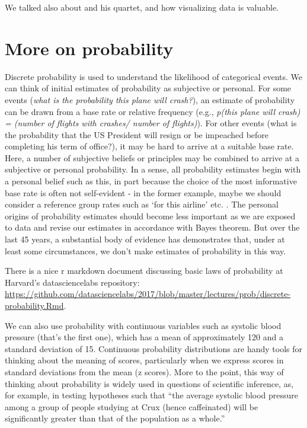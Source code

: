 \documentclass[]{book}
\theoremstyle{definition}
\theoremstyle{definition}
\theoremstyle{definition}
\theoremstyle{remark}
\begin{document}
We talked also about \citet{anscombe1973graphs} and his quartet, and how
visualizing data is valuable.

\section{More on probability}\label{more-on-probability}

Discrete probability is used to understand the likelihood of categorical
events. We can think of initial estimates of probability as subjective
or personal. For some events (\emph{what is the probability this plane
will crash?}), an estimate of probability can be drawn from a base rate
or relative frequency (e.g., \emph{p(this plane will crash) = (number of
flights with crashes/ number of flights)}). For other events (what is
the probability that the US President will resign or be impeached before
completing his term of office?), it may be hard to arrive at a suitable
base rate. Here, a number of subjective beliefs or principles may be
combined to arrive at a subjective or personal probability. In a sense,
all probability estimates begin with a personal belief such as this, in
part because the choice of the most informative base rate is often not
self-evident - in the former example, maybe we should consider a
reference group rates such as `for this airline' etc.
\citep[(][]{lanning1987some}. The personal origins of probability
estimates should become less important as we are exposed to data and
revise our estimates in accordance with Bayes theorem. But over the last
45 years, a substantial body of evidence has demonstrates that, under at
least some circumstances, we don't make estimates of probability in this
way.

There is a nice r markdown document discussing basic laws of probability
at Harvard's datasciencelabs repository:
\url{https://github.com/datasciencelabs/2017/blob/master/lectures/prob/discrete-probability.Rmd}.

We can also use probability with continuous variables such as systolic
blood pressure (that's the first one), which has a mean of approximately
120 and a standard deviation of 15. Continuous probability distributions
are handy tools for thinking about the meaning of scores, particularly
when we express scores in standard deviations from the mean (z scores).
More to the point, this way of thinking about probability is widely used
in questions of scientific inference, as, for example, in testing
hypotheses such that ``the average systolic blood pressure among a group
of people studying at Crux (hence caffeinated) will be significantly
greater than that of the population as a whole.''
\end{document}
